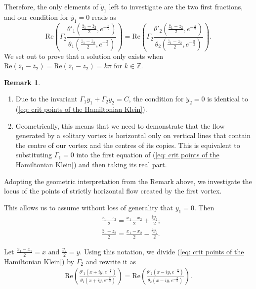 \documentclass[11pt,twoside]{article}
\theoremstyle{definition}
\newtheorem{rem}[theorem]{Remark}
\numberwithin{equation}{section}
\begin{document}
Therefore, the only elements of $\dot{y}_1$ left to investigate are the two first fractions, and our  condition for $\dot{y_1}=0$ reads as
\begin{equation}
\label{eq: crit points of the Hamiltonian Klein}
\mathrm{Re}\left(\Gamma_2\frac{\theta'_1\left(\frac{\bar{z}_1 - \bar{z}_2}{2},e^{-\frac{\pi}{2}}  \right)}{\theta_1\left(\frac{\bar{z}_1 - \bar{z}_2}{2},e^{-\frac{\pi}{2}}  \right)}\right)= \mathrm{Re}\left(\Gamma_2\frac{\theta'_2\left(\frac{\bar{z}_1 - z_2}{2},e^{-\frac{\pi}{2}} \right)}{\theta_2\left(\frac{\bar{z}_1 - z_2}{2},e^{-\frac{\pi}{2}} \right)}\right).
\end{equation}
We set out to prove that a solution only exists when $\mathrm{Re}\left(\bar{z}_1 -\bar{z}_2\right)= \mathrm{Re}\left(\bar{z}_1 -z_2\right)  = k\pi$ for $k\in\mathbb{Z}$. 
\begin{rem}
\begin{enumerate}
    \item Due to the invariant $\Gamma_1y_1 + \Gamma_2y_2=C$, the condition for $\dot{y}_2=0$ is identical to (\ref{eq: crit points of the Hamiltonian Klein}).
    \item Geometrically, this means that we need to demonstrate that the flow generated by a solitary vortex is horizontal only on vertical lines that contain the centre of our vortex and the centres of its copies. This is equivalent to substituting $\Gamma_1=0$ into the first equation of (\ref{eq: crit points of the Hamiltonian Klein}) and then taking its real part. 
\end{enumerate}
\end{rem}
Adopting the geometric interpretation from the Remark above, we investigate the locus of the points of strictly horizontal flow created by the first vortex. 


This allows us to  assume without loss of generality that $y_1=0$. Then 
\begin{equation*}
    \begin{split}
        &\frac{\bar{z}_1-\bar{z}_2}{2} = \frac{x_1-x_2}{2} + \frac{i y_2}{2};\\
        &\frac{\bar{z}_1-z_2}{2}= \frac{x_1-x_2}{2} - \frac{i y_2}{2}. 
    \end{split}
\end{equation*}

Let $\frac{x_1-x_2}{2}  = x$ and $\frac{y_2}{2} = y$. Using this notation, we divide  (\ref{eq: crit points of the Hamiltonian Klein}) by $\Gamma_2$ and rewrite it  as
\begin{equation}
    \label{eq: transformation criticl Hamiltonian rewrite}
    \begin{split}
    \mathrm{Re}\left(\frac{\theta'_1\left(x + i y, e^{-\frac{\pi}{2}}\right)}{\theta_1\left(x + i y, e^{-\frac{\pi}{2}}\right)}\right) = \mathrm{Re}\left(\frac{\theta'_2\left(x - i y, e^{-\frac{\pi}{2}}\right)}{\theta_2\left(x - i y, e^{-\frac{\pi}{2}}\right)}\right).
    \end{split}
\end{equation}
\end{document}
